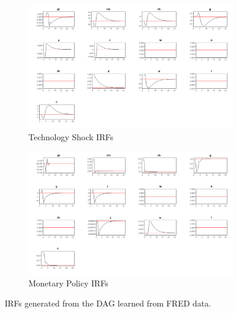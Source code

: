 \documentclass{article}
\begin{document}
\begin{figure}

  \centering
  \begin{subfigure}{0.8\textwidth}
    \centering
    \includegraphics[width=\linewidth]{images/real_z_irf.png} 
    \caption{Technology Shock IRFs}
    \label{simirf}
  \end{subfigure}
  \begin{subfigure}{0.8\textwidth}
    \centering  
    \includegraphics[width=\linewidth]{images/real_rm_irf.png}
    \caption{Monetary Policy IRFs}
    \label{gtirf}
  \end{subfigure}
  \caption{IRFs generated from the DAG learned from FRED data.}
  \label{fredirf}
\end{figure}
\end{document}
